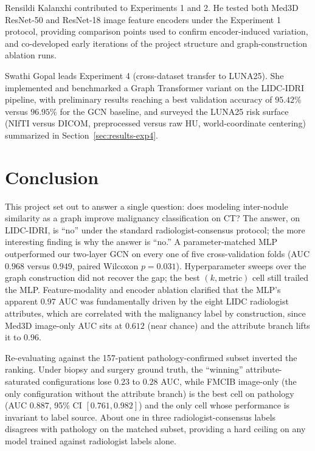 \documentclass[10pt,letterpaper,twocolumn]{article}
\begin{document}
Rensildi Kalanxhi contributed to Experiments 1 and 2. He tested both Med3D ResNet-50 and ResNet-18 image feature encoders under the Experiment 1 protocol, providing comparison points used to confirm encoder-induced variation, and co-developed early iterations of the project structure and graph-construction ablation runs.

Swathi Gopal leads Experiment 4 (cross-dataset transfer to LUNA25). She implemented and benchmarked a Graph Transformer variant on the LIDC-IDRI pipeline, with preliminary results reaching a best validation accuracy of $95.42\%$ versus $96.95\%$ for the GCN baseline, and surveyed the LUNA25 risk surface (NIfTI versus DICOM, preprocessed versus raw HU, world-coordinate centering) summarized in Section~\ref{sec:results-exp4}.

\section{Conclusion}
\label{sec:conclusion}

This project set out to answer a single question: does modeling inter-nodule similarity as a graph improve malignancy classification on CT? The answer, on LIDC-IDRI, is ``no'' under the standard radiologist-consensus protocol; the more interesting finding is why the answer is ``no.'' A parameter-matched MLP outperformed our two-layer GCN on every one of five cross-validation folds (AUC $0.968$ versus $0.949$, paired Wilcoxon $p = 0.031$). Hyperparameter sweeps over the graph construction did not recover the gap; the best $(k, \text{metric})$ cell still trailed the MLP. Feature-modality and encoder ablation clarified that the MLP's apparent $0.97$ AUC was fundamentally driven by the eight LIDC radiologist attributes, which are correlated with the malignancy label by construction, since Med3D image-only AUC sits at $0.612$ (near chance) and the attribute branch lifts it to $0.96$.

Re-evaluating against the 157-patient pathology-confirmed subset inverted the ranking. Under biopsy and surgery ground truth, the ``winning'' attribute-saturated configurations lose $0.23$ to $0.28$ AUC, while FMCIB image-only (the only configuration without the attribute branch) is the best cell on pathology (AUC $0.887$, 95\% CI $[0.761, 0.982]$) and the only cell whose performance is invariant to label source. About one in three radiologist-consensus labels disagrees with pathology on the matched subset, providing a hard ceiling on any model trained against radiologist labels alone.
\end{document}
